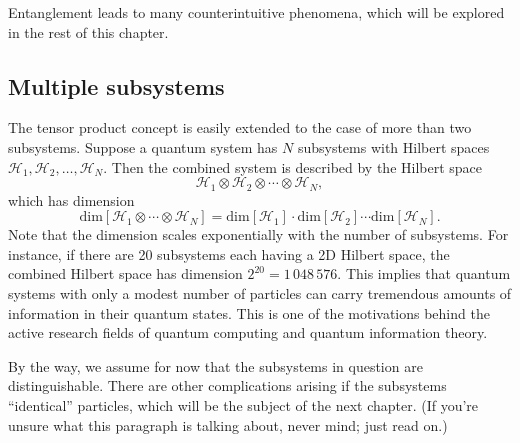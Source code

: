\documentclass[pra,12pt]{revtex4-2}
\begin{document}
Entanglement leads to many counterintuitive phenomena, which will be
explored in the rest of this chapter.

\subsection{Multiple subsystems}

The tensor product concept is easily extended to the case of more than
two subsystems.  Suppose a quantum system has $N$ subsystems with
Hilbert spaces $\mathscr{H}_1, \mathscr{H}_2, \dots, \mathscr{H}_N$.
Then the combined system is described by the Hilbert space
\begin{equation}
  \mathscr{H}_1 \otimes \mathscr{H}_2 \otimes \cdots \otimes
  \mathscr{H}_N,
\end{equation}
which has dimension
\begin{equation}
  \mathrm{dim}\left[\mathscr{H}_1 \otimes \cdots \otimes \mathscr{H}_N\right]
  = \mathrm{dim}\left[\mathscr{H}_1\right] \cdot
  \mathrm{dim}\left[\mathscr{H}_2\right] \cdots
  \mathrm{dim}\left[\mathscr{H}_N\right].
\end{equation}
Note that the dimension scales exponentially with the number of
subsystems.  For instance, if there are 20 subsystems each having a 2D
Hilbert space, the combined Hilbert space has dimension $2^{20}
=1\,048\,576$.  This implies that quantum systems with only a modest
number of particles can carry tremendous amounts of information in
their quantum states.  This is one of the motivations behind the
active research fields of quantum computing and quantum information
theory.


By the way, we assume for now that the subsystems in question are
distinguishable.  There are other complications arising if the
subsystems ``identical'' particles, which will be the subject of the
next chapter.  (If you're unsure what this paragraph is talking about,
never mind; just read on.)
\end{document}

